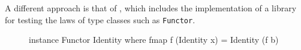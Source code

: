 \begin{note}
  A different approach is that of \parencite{jeuring-2012}, which
  includes the implementation of a library for testing the laws of
  type classes such as \texttt{Functor}.
\end{note}


\begin{example}
  \label{ex:functor-identity-haskell}
  \hfill
  \begin{figure}[htbp]
    \begin{codehaskell}
instance Functor Identity where
  fmap f (Identity x) = Identity (f b)
    \end{codehaskell}
    \caption{}
    \label{fig:functor-identity-haskell}
  \end{figure}
\end{example}

